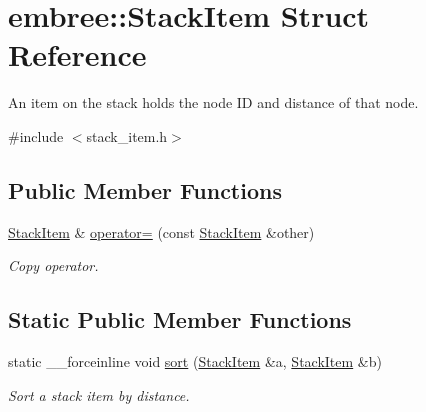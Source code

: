 \hypertarget{structembree_1_1_stack_item}{
\section{embree::StackItem Struct Reference}
\label{structembree_1_1_stack_item}
}


An item on the stack holds the node ID and distance of that node.  




{\ttfamily \#include $<$stack\_\-item.h$>$}

\subsection*{Public Member Functions}
\begin{DoxyCompactItemize}
\item 
\hypertarget{structembree_1_1_stack_item_a23f8410a2b67c2bb8309cafdd8abbff3}{
\hyperlink{structembree_1_1_stack_item}{StackItem} \& \hyperlink{structembree_1_1_stack_item_a23f8410a2b67c2bb8309cafdd8abbff3}{operator=} (const \hyperlink{structembree_1_1_stack_item}{StackItem} \&other)}
\label{structembree_1_1_stack_item_a23f8410a2b67c2bb8309cafdd8abbff3}

\begin{DoxyCompactList}\small\item\em Copy operator. \item\end{DoxyCompactList}\end{DoxyCompactItemize}
\subsection*{Static Public Member Functions}
\begin{DoxyCompactItemize}
\item 
static \_\-\_\-forceinline void \hyperlink{structembree_1_1_stack_item_a84adf9ad34dec4dcd4e85b67e3517bb1}{sort} (\hyperlink{structembree_1_1_stack_item}{StackItem} \&a, \hyperlink{structembree_1_1_stack_item}{StackItem} \&b)
\begin{DoxyCompactList}\small\item\em Sort a stack item by distance. \item\end{DoxyCompactList}\end{DoxyCompactItemize}
